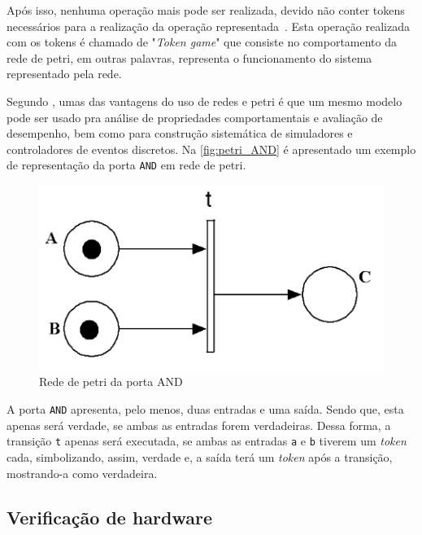 \par
Após isso, nenhuma operação mais pode ser realizada, devido não conter tokens necessários para a realização da operação representada~\cite{murata1989petri}. Esta operação realizada com os tokens é chamado de "\textit{Token game}" que consiste no comportamento da rede de petri, em outras palavras, representa o funcionamento do sistema representado pela rede\cite{halder2006}.

\par
Segundo , umas das vantagens do uso de redes e petri é que um mesmo modelo pode ser usado pra análise de propriedades comportamentais e avaliação de desempenho, bem como para construção sistemática de simuladores e controladores de eventos discretos. Na \autoref{fig:petri_AND} é apresentado um exemplo de representação da porta \texttt{AND} em rede de petri.

\begin{figure}[H]
	\begin{center}
    \caption{\label{fig:petri_AND}Rede de petri da porta AND}
	\includegraphics[scale=0.60]{Figuras/and_petri.png}
	\end{center}
\end{figure}

\par
A porta \texttt{AND} apresenta, pelo menos, duas entradas e uma saída. Sendo que, esta apenas será verdade, se ambas as entradas forem verdadeiras. Dessa forma, a transição \texttt{t} apenas será executada, se ambas as entradas \texttt{a} e \texttt{b} tiverem um \textit{token} cada, simbolizando, assim, verdade e, a saída terá um \textit{token} após a transição, mostrando-a como verdadeira.
\subsection{Verificação de hardware}


